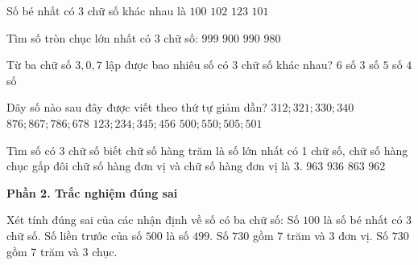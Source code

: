 \begin{ex} %
Số bé nhất có 3 chữ số khác nhau là
\choice
{$100$}
{\True $102$}
{$123$}
{$101$}
\end{ex}

\begin{ex} %
Tìm số tròn chục lớn nhất có 3 chữ số:
\choice
{$999$}
{$900$}
{\True $990$}
{$980$}
\end{ex}

\begin{ex} %
Từ ba chữ số $3, 0, 7$ lập được bao nhiêu số có 3 chữ số khác nhau?
\choice
{$6$ số}
{$3$ số}
{$5$ số}
{\True $4$ số}
\end{ex}

\begin{ex} %
Dãy số nào sau đây được viết theo thứ tự giảm dần?
\choice
{$312; 321; 330; 340$}
{\True $876; 867; 786; 678$}
{$123; 234; 345; 456$}
{$500; 550; 505; 501$}
\end{ex}

\begin{ex} %
Tìm số có 3 chữ số biết chữ số hàng trăm là số lớn nhất có 1 chữ số, chữ số hàng chục gấp đôi chữ số hàng đơn vị và chữ số hàng đơn vị là 3.
\choice
{\True $963$}
{$936$}
{$863$}
{$962$}
\end{ex}

\textbf{Phần 2. Trắc nghiệm đúng sai}

\begin{ex} %
Xét tính đúng sai của các nhận định về số có ba chữ số:
\choiceTF
{\True Số $100$ là số bé nhất có 3 chữ số.}
{\True Số liền trước của số $500$ là số $499$.}
{Số $730$ gồm 7 trăm và 3 đơn vị.}
{\True Số $730$ gồm 7 trăm và 3 chục.}
\end{ex}

